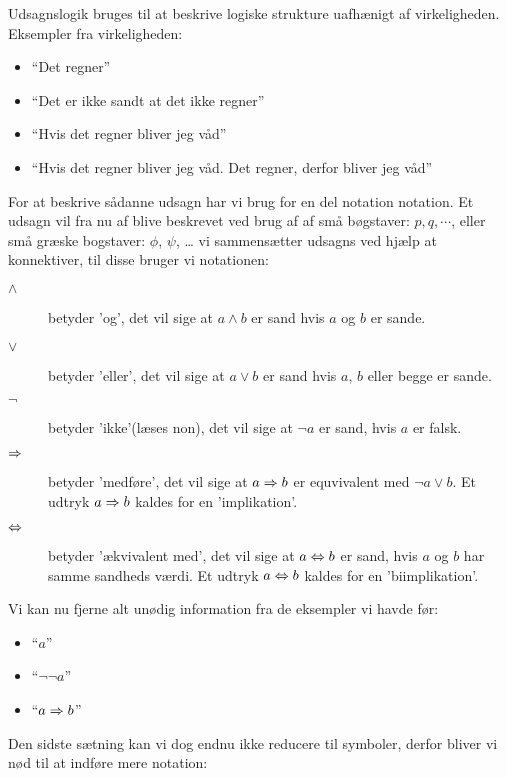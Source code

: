 Udsagnslogik bruges til at beskrive logiske strukture uafhænigt af virkeligheden.
Eksempler fra virkeligheden:
\begin{itemize}
    \item ``Det regner''
    \item ``Det er ikke sandt at det ikke regner''
    \item ``Hvis det regner bliver jeg våd''
    \item ``Hvis det regner bliver jeg våd. Det regner, derfor bliver jeg våd''
\end{itemize}

For at beskrive sådanne udsagn har vi brug for en del notation notation. Et udsagn vil fra nu af blive beskrevet ved brug af af små bøgstaver: $p, q, \cdots$,
eller små græske bogstaver: $\phi$, $\psi$, \ldots
vi sammensætter udsagns ved hjælp at konnektiver, til disse bruger vi notationen:

\begin{description}
    \item[$\land$] betyder 'og', det vil sige at $a \land b$ er sand hvis $a$ og $b$ er sande.
    \item[$\lor$] betyder 'eller', det vil sige at $a \lor b$ er sand hvis $a$, $b$ eller begge er sande.
    \item[$\lnot$] betyder 'ikke'(læses non), det vil sige at $\lnot a$ er sand, hvis $a$ er falsk.
    \item[$\imp$] betyder 'medføre', det vil sige at $a \imp b$ er equvivalent med $\lnot a \lor b$. Et udtryk $a \imp b$ kaldes for en 'implikation'.
    \item[$\bimp$] betyder 'ækvivalent med', det vil sige at $a \bimp b$ er sand, hvis $a$ og $b$ har samme sandheds værdi. Et udtryk $a \bimp b$ kaldes for en 'biimplikation'.
\end{description}



Vi kan nu fjerne alt unødig information fra de eksempler vi havde før:
\begin{itemize}
    \item ``$a$''
    \item ``$\lnot \lnot a$''
    \item ``$a \imp b$''
\end{itemize}

Den sidste sætning kan vi dog endnu ikke reducere til symboler, derfor bliver vi nød til at indføre mere notation:

\begin{prooftree}
\end{prooftree}

